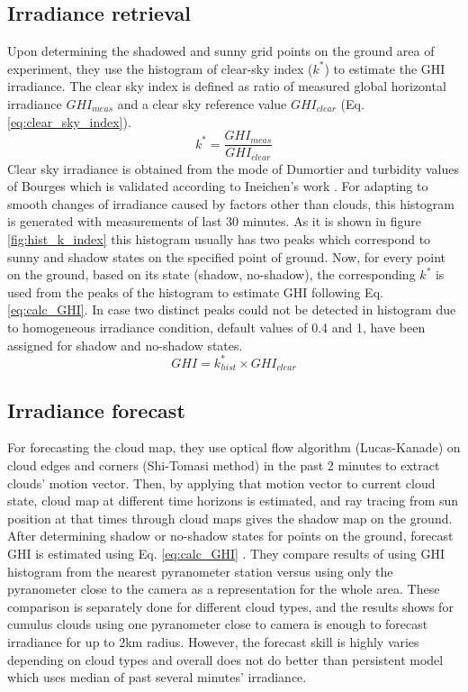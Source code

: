 \subsection{Irradiance retrieval}
Upon determining the shadowed and sunny grid points on the ground area of experiment, they use the histogram of clear-sky index ($k^{*}$) to estimate the GHI irradiance. The clear sky index is defined as ratio of measured global horizontal irradiance $GHI_{meas}$ and a clear sky reference value $GHI_{clear}$ (Eq. \ref{eq:clear_sky_index}).
\begin{equation}
\label{eq:clear_sky_index}
k^{*} =  \frac{GHI_{meas}}{GHI_{clear}}
\end{equation}
Clear sky irradiance is obtained from the mode of Dumortier \cite{clear_sky_model} and turbidity values of Bourges \cite{turbidity} which is validated according to Ineichen's work \cite{Ineichen}.
For adapting to smooth changes of irradiance caused by factors other than clouds, this histogram is generated with measurements of last 30 minutes. As it is shown in figure \ref{fig:hist_k_index} this histogram usually has two peaks which correspond to sunny and shadow states on the specified point of ground. Now, for every point on the ground, based on its state (shadow, no-shadow), the corresponding $k^{*}$ is used from the peaks of the histogram to estimate GHI following Eq. \ref{eq:calc_GHI}. In case two distinct peaks could not be detected in histogram due to homogeneous irradiance condition, default values of 0.4 and 1, have been assigned for shadow and no-shadow states.
\begin{equation}
\label{eq:calc_GHI}
GHI = k^{*}_{hist} \times GHI_{clear}
\end{equation}

\subsection{Irradiance forecast}
For forecasting the cloud map, they use optical flow algorithm (Lucas-Kanade) on cloud edges and corners (Shi-Tomasi method) in the past 2 minutes to extract clouds' motion vector. Then, by applying that motion vector to current cloud state, cloud map at different time horizons is estimated, and ray tracing from sun position at that times through cloud maps gives the shadow map on the ground. After determining shadow or no-shadow states for points on the ground, forecast GHI is estimated using Eq. \ref{eq:calc_GHI} . They compare results of using GHI histogram from the nearest pyranometer station versus using only the pyranometer close to the camera as a representation for the whole area. These comparison is separately done for different cloud types, and the results shows for cumulus clouds using one pyranometer close to camera is enough to forecast irradiance for up to 2km radius. However, the forecast skill is highly varies depending on cloud types and overall does not do better than persistent model which uses median of past several minutes' irradiance.


